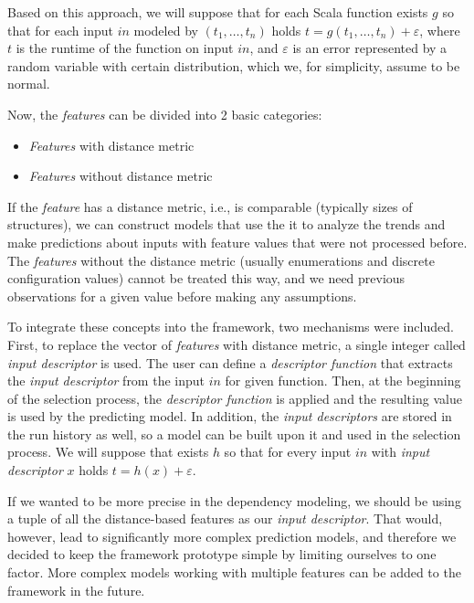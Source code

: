Based on this approach, we will suppose that for each Scala function exists $g$ so that for each input $in$ modeled by $(t_1, \dots, t_n)$ holds \(t = g(t_1, \dots, t_n) + \varepsilon\), where \(t\) is the runtime of the function on input \(in\), and $\varepsilon$ is an error represented by a random variable with certain distribution, which we, for simplicity, assume to be normal. 

Now, the \textit{features} can be divided into 2 basic categories:

\begin{itemize}
	\item \textit{Features} with distance metric
	\item \textit{Features} without distance metric
\end{itemize}

If the \textit{feature} has a distance metric, i.e., is comparable (typically sizes of structures), we can construct models that use the it to analyze the trends and make predictions about inputs with feature values that were not processed before. The \textit{features} without the distance metric (usually enumerations and discrete configuration values) cannot be treated this way, and we need previous observations for a given value before making any assumptions. 

To integrate these concepts into the framework, two mechanisms were included. First, to replace the vector of \textit{features} with distance metric, a single integer called \textit{input descriptor} is used. The user can define a \textit{descriptor function} that extracts the \textit{input descriptor} from the input $in$ for given function. Then, at the beginning of the selection process, the \textit{descriptor function} is applied and the resulting value is used by the predicting model. In addition, the \textit{input descriptors} are stored in the run history as well, so a model can be built upon it and used in the selection process. We will suppose that exists $h$ so that for every input $in$ with \textit{input descriptor} $x$ holds \(t = h(x) + \varepsilon\).

If we wanted to be more precise in the dependency modeling, we should be using a tuple of all the distance-based features as our \textit{input descriptor}. That would, however, lead to significantly more complex prediction models, and therefore we decided to keep the framework prototype simple by limiting ourselves to one factor. More complex models working with multiple features can be added to the framework in the future.


